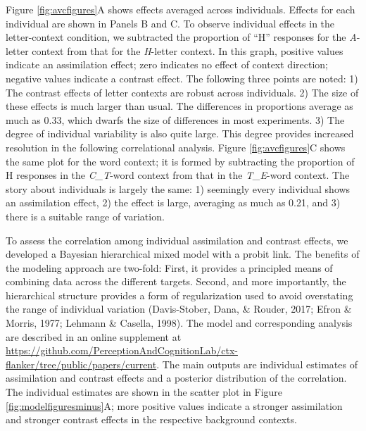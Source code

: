 \documentclass[english,floatsintext,man]{apa6}
\begin{document}
Figure \ref{fig:avcfigures}A shows effects averaged across individuals.
Effects for each individual are shown in Panels B and C. To observe
individual effects in the letter-context condition, we subtracted the
proportion of \enquote{H} responses for the \emph{A}-letter context from
that for the \emph{H}-letter context. In this graph, positive values
indicate an assimilation effect; zero indicates no effect of context
direction; negative values indicate a contrast effect. The following
three points are noted: 1) The contrast effects of letter contexts are
robust across individuals. 2) The size of these effects is much larger
than usual. The differences in proportions average as much as 0.33,
which dwarfs the size of differences in most experiments. 3) The degree
of individual variability is also quite large. This degree provides
increased resolution in the following correlational analysis. Figure
\ref{fig:avcfigures}C shows the same plot for the word context; it is
formed by subtracting the proportion of H responses in the
\emph{C\_T}-word context from that in the \emph{T\_E}-word context. The
story about individuals is largely the same: 1) seemingly every
individual shows an assimilation effect, 2) the effect is large,
averaging as much as 0.21, and 3) there is a suitable range of
variation.

To assess the correlation among individual assimilation and contrast
effects, we developed a Bayesian hierarchical mixed model with a probit
link. The benefits of the modeling approach are two-fold: First, it
provides a principled means of combining data across the different
targets. Second, and more importantly, the hierarchical structure
provides a form of regularization used to avoid overstating the range of
individual variation (Davis-Stober, Dana, \& Rouder, 2017; Efron \&
Morris, 1977; Lehmann \& Casella, 1998). The model and corresponding
analysis are described in an online supplement at
\url{https://github.com/PerceptionAndCognitionLab/ctx-flanker/tree/public/papers/current}.
The main outputs are individual estimates of assimilation and contrast
effects and a posterior distribution of the correlation. The individual
estimates are shown in the scatter plot in Figure
\ref{fig:modelfiguresminus}A; more positive values indicate a stronger
assimilation and stronger contrast effects in the respective background
contexts.
\end{document}
